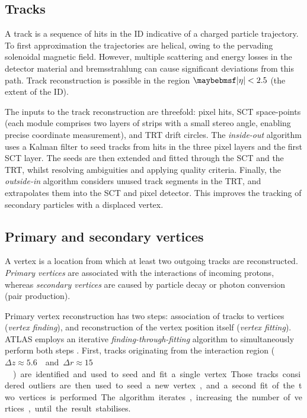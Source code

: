 

\subsection{Tracks}
\label{sec:objects:tracks}

A track is a sequence of hits in the \ac{ID} indicative of a charged particle trajectory. 
To first approximation the trajectories are helical, owing to the pervading solenoidal 
magnetic field. However, multiple scattering and energy losses in the detector material 
and bremsstrahlung can cause significant deviations from this path. Track reconstruction 
is possible in the region $\mods{\eta} < 2.5$ (the extent of the \ac{ID}).

The inputs to the track reconstruction are threefold: pixel hits, \acs{SCT} space-points 
(each module comprises two layers of strips with a small stereo angle, enabling precise 
coordinate measurement), and \acs{TRT} drift circles. The \textit{inside-out} algorithm 
\cite{Tracking,ATLAS:ExpectPerf} uses a Kalman filter to seed tracks from hits in the 
three pixel layers and the first \acs{SCT} layer. The seeds are then extended and fitted 
through the \acs{SCT} and the \acs{TRT}, whilst resolving ambiguities and applying 
quality criteria. Finally, the \textit{outside-in} algorithm \cite{Tracking} considers 
unused track segments in the \acs{TRT}, and extrapolates them into the \acs{SCT} and 
pixel detector. This improves the tracking of secondary particles with a displaced vertex.



\subsection{Primary and secondary vertices}
\label{sec:objects:vertices}

A vertex is a location from which at least two outgoing tracks are reconstructed. 
\textit{Primary vertices} are associated with the interactions of incoming protons, 
whereas \textit{secondary vertices} are caused by particle decay or photon conversion
(\epluseminus pair production).

Primary vertex reconstruction has two steps: association of tracks to vertices 
(\textit{vertex finding}), and reconstruction of the vertex position itself 
(\textit{vertex fitting}). ATLAS employs an iterative \textit{finding-through-fitting} 
algorithm to simultaneously perform both steps \cite{PrimVertexFinding,AllVertexFinding}.
First, tracks originating from the interaction region 
(\unit{$\Delta z \approx 5.6$}{\centi\metre} and 
\unit{$\Delta r \approx 15$}{\micro\metre}) are identified and used to seed and fit a 
single vertex. Those tracks considered outliers are then used to seed a new vertex, and a 
second fit of the two vertices is performed. The algorithm iterates, increasing the 
number of vertices, until the result stabilises.

